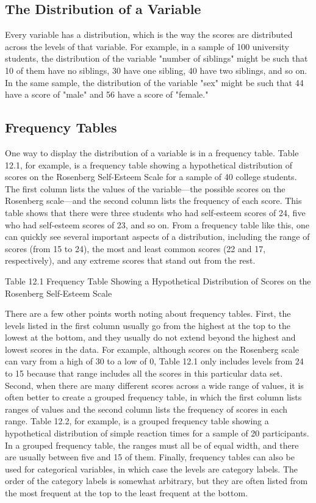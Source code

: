 \subsection{The Distribution of a Variable}



Every variable has a distribution, which is the way the scores are distributed across the levels of that variable. For example, in a sample of 100 university students, the distribution of the variable "number of siblings" might be such that 10 of them have no siblings, 30 have one sibling, 40 have two siblings, and so on. In the same sample, the distribution of the variable "sex" might be such that 44 have a score of "male" and 56 have a score of "female."

\subsection{Frequency Tables}

One way to display the distribution of a variable is in a frequency table. Table 12.1, for example, is a frequency table showing a hypothetical distribution of scores on the Rosenberg Self-Esteem Scale for a sample of 40 college students. The first column lists the values of the variable---the possible scores on the Rosenberg scale---and the second column lists the frequency of each score. This table shows that there were three students who had self-esteem scores of 24, five who had self-esteem scores of 23, and so on. From a frequency table like this, one can quickly see several important aspects of a distribution, including the range of scores (from 15 to 24), the most and least common scores (22 and 17, respectively), and any extreme scores that stand out from the rest.



Table 12.1 Frequency Table Showing a Hypothetical Distribution of Scores on the Rosenberg Self-Esteem Scale


There are a few other points worth noting about frequency tables. First, the levels listed in the first column usually go from the highest at the top to the lowest at the bottom, and they usually do not extend beyond the highest and lowest scores in the data. For example, although scores on the Rosenberg scale can vary from a high of 30 to a low of 0, Table 12.1 only includes levels from 24 to 15 because that range includes all the scores in this particular data set. Second, when there are many different scores across a wide range of values, it is often better to create a grouped frequency table, in which the first column lists ranges of values and the second column lists the frequency of scores in each range. Table 12.2, for example, is a grouped frequency table showing a hypothetical distribution of simple reaction times for a sample of 20 participants. In a grouped frequency table, the ranges must all be of equal width, and there are usually between five and 15 of them. Finally, frequency tables can also be used for categorical variables, in which case the levels are category labels. The order of the category labels is somewhat arbitrary, but they are often listed from the most frequent at the top to the least frequent at the bottom.


